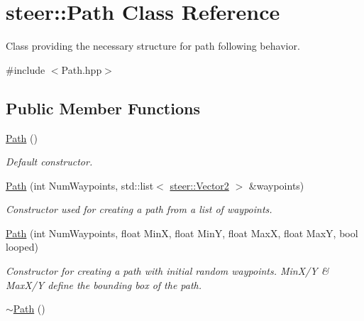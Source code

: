 \hypertarget{classsteer_1_1_path}{\section{steer\-:\-:Path Class Reference}
\label{classsteer_1_1_path}
}


Class providing the necessary structure for path following behavior.  




{\ttfamily \#include $<$Path.\-hpp$>$}

\subsection*{Public Member Functions}
\begin{DoxyCompactItemize}
\item 
\hypertarget{classsteer_1_1_path_a9ea093f9196ead3d5724509d7fc4d3e5}{\hyperlink{classsteer_1_1_path_a9ea093f9196ead3d5724509d7fc4d3e5}{Path} ()}\label{classsteer_1_1_path_a9ea093f9196ead3d5724509d7fc4d3e5}

\begin{DoxyCompactList}\small\item\em Default constructor. \end{DoxyCompactList}\item 
\hyperlink{classsteer_1_1_path_a36c4ed5fc8d2d3e4747920c0bedfbb97}{Path} (int Num\-Waypoints, std\-::list$<$ \hyperlink{structsteer_1_1_vector2}{steer\-::\-Vector2} $>$ \&waypoints)
\begin{DoxyCompactList}\small\item\em Constructor used for creating a path from a list of waypoints. \end{DoxyCompactList}\item 
\hyperlink{classsteer_1_1_path_a4c0811fa900426c5ee36d00c33af7ed5}{Path} (int Num\-Waypoints, float Min\-X, float Min\-Y, float Max\-X, float Max\-Y, bool looped)
\begin{DoxyCompactList}\small\item\em Constructor for creating a path with initial random waypoints. Min\-X/\-Y \& Max\-X/\-Y define the bounding box of the path. \end{DoxyCompactList}\item 
\hypertarget{classsteer_1_1_path_aaae6cb3aed1cd324e36ad61fd88221db}{\hyperlink{classsteer_1_1_path_aaae6cb3aed1cd324e36ad61fd88221db}{$\sim$\-Path} ()}\label{classsteer_1_1_path_aaae6cb3aed1cd324e36ad61fd88221db}


\end{DoxyCompactItemize}
